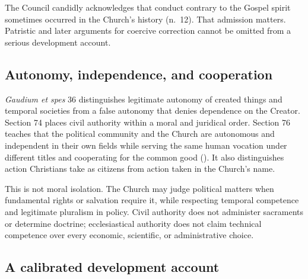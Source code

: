 The Council candidly acknowledges that conduct contrary to the Gospel spirit sometimes occurred in the Church's history (n.~12). That admission matters. Patristic and later arguments for coercive correction cannot be omitted from a serious development account.

\subsection{Autonomy, independence, and cooperation}

\emph{Gaudium et spes} 36 distinguishes legitimate autonomy of created things and temporal societies from a false autonomy that denies dependence on the Creator. Section 74 places civil authority within a moral and juridical order. Section 76 teaches that the political community and the Church are autonomous and independent in their own fields while serving the same human vocation under different titles and cooperating for the common good (). It also distinguishes action Christians take as citizens from action taken in the Church's name.

This is not moral isolation. The Church may judge political matters when fundamental rights or salvation require it, while respecting temporal competence and legitimate pluralism in policy. Civil authority does not administer sacraments or determine doctrine; ecclesiastical authority does not claim technical competence over every economic, scientific, or administrative choice.

\subsection{A calibrated development account}


